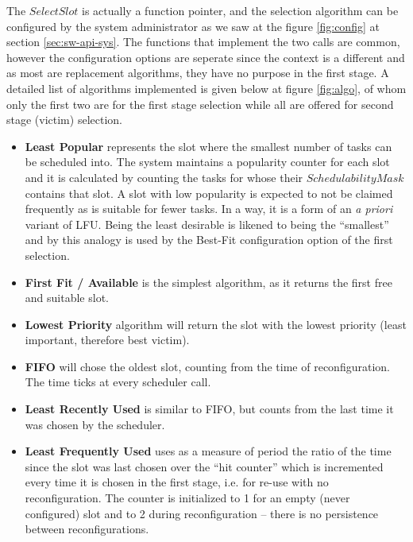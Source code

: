 The $SelectSlot$ is actually a function pointer, and the selection algorithm can be configured by the system
administrator as we saw at the figure \ref{fig:config} at section \ref{sec:sw-api-sys}. The functions that
implement the two calls are common, however the configuration options are seperate since the context is
a different and as most are replacement algorithms, they have no purpose in the first stage.
A detailed list of algorithms implemented is given below at figure \ref{fig:algo}, of whom only the first two
are for the first stage selection while all are offered for second stage (victim) selection.

\begin{itemize}
\item	\textbf{Least Popular} represents the slot where the smallest number of tasks can be scheduled into.
	The system maintains a popularity counter for each slot and it is calculated by counting the tasks
	for whose their $SchedulabilityMask$ contains that slot. A slot with low popularity is expected
	to not be claimed frequently as is suitable for fewer tasks. In a way, it is a form of an {\em a priori} variant of LFU.
	Being the least desirable is likened to being the ``smallest'' and by this analogy is used by 
	the Best-Fit configuration option of the first selection.
\item	\textbf{First Fit / Available} is the simplest algorithm, as it returns the first free and suitable slot.
\item	\textbf{Lowest Priority} algorithm will return the slot with the lowest priority (least important, therefore best victim).
\item	\textbf{FIFO} will chose the oldest slot, counting from the time of reconfiguration. The time ticks at every scheduler call.
\item	\textbf{Least Recently Used} is similar to FIFO, but counts from the last time it was chosen by the scheduler.
\item	\textbf{Least Frequently Used} uses as a measure of period the ratio of the time since the slot was last chosen
	over the ``hit counter'' which is incremented every time it is chosen in the first stage, i.e. for re-use with no reconfiguration.
	The counter is initialized to 1 for an empty (never configured) slot 
	and to 2 during reconfiguration -- there is no persistence between reconfigurations.
\end{itemize}



